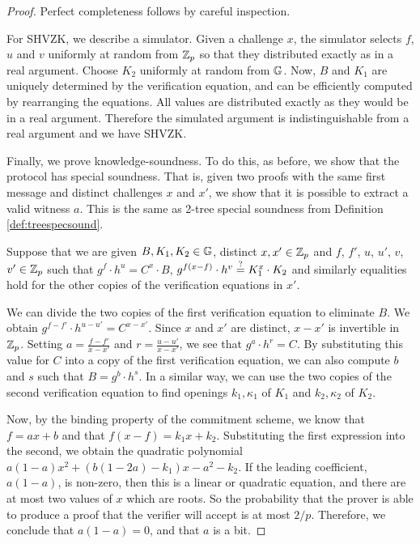 \begin{proof} Perfect completeness follows by careful inspection.

For SHVZK, we describe a simulator. Given a challenge $x$, the simulator selects $f$, $u$ and $v$ uniformly at random from $\mathbb{Z}_p$ so that they distributed exactly as in a real argument. Choose $K_2$ uniformly at random from $\mathbb{G}$. Now, $B$ and $K_1$ are uniquely determined by the verification equation, and can be efficiently computed by rearranging the equations. All values are distributed exactly as they would be in a real argument. Therefore the simulated argument is indistinguishable from a real argument and we have SHVZK.

Finally, we prove knowledge-soundness. To do this, as before, we show that the protocol has special soundness. That is, given two proofs with the same first message and distinct challenges $x$ and $x'$, we show that it is possible to extract a valid witness $a$. This is the same as 2-tree special soundness from Definition \ref{def:treespecsound}.

Suppose that we are given $B,K_1,K_2 \in \mathbb{G}$, distinct $x,x' \in \mathbb{Z}_p$ and $f$, $f'$, $u$, $u'$, $v$, $v'
 \in \mathbb{Z}_p$ such that $g^f \cdot h^u = C^x \cdot B$, $g^{f(x-f)} \cdot h^v \overset{?}{=} K_1^x \cdot K_2$ and similarly equalities hold for the other copies of the verification equations in $x'$. 

We can divide the two copies of the first verification equation to eliminate $B$. We obtain $g^{f-f'}  \cdot h^{u-u'}= C^{x-x'}$. Since $x$ and $x'$ are distinct, $x-x'$ is invertible in $\mathbb{Z}_p$. Setting $a = \frac{f-f'}{x-x'}$ and $r = \frac{u-u'}{x-x'}$, we see that $g^a \cdot h^r = C$. By substituting this value for $C$ into a copy of the first verification equation, we can also compute $b$ and $s$ such that $B = g^b \cdot h^s$. In a similar way, we can use the two copies of the second verification equation to find openings $k_1,\kappa_1$ of $K_1$ and $k_2,\kappa_2$ of $K_2$.

Now, by the binding property of the commitment scheme, we know that $f = ax+b$ and that $f(x-f) = k_1 x + k_2$. Substituting the first expression into the second, we obtain the quadratic polynomial $a(1-a)x^2 + (b(1-2a)-k_1)x-a^2-k_2$. If the leading coefficient, $a(1-a)$, is non-zero, then this is a linear or quadratic equation, and there are at most two values of $x$ which are roots. So the probability that the prover is able to produce a proof that the verifier will accept is at most $2/p$. Therefore, we conclude that $a(1-a) = 0$, and that $a$ is a bit.


\end{proof}
